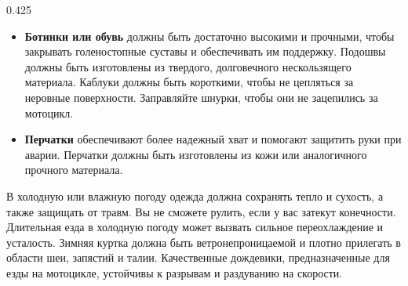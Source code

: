 \begin{langblock}{0.425}
\begin{rus}
\begin{itemize}[nosep]
			\item \textbf{Ботинки или обувь} должны быть достаточно высокими и прочными, чтобы закрывать голеностопные суставы и обеспечивать им поддержку. Подошвы должны быть изготовлены из твердого, долговечного нескользящего материала. Каблуки должны быть короткими, чтобы не цепляться за неровные поверхности. Заправляйте шнурки, чтобы они не зацепились за мотоцикл.
			\item \textbf{Перчатки} обеспечивают более надежный хват и помогают защитить руки при аварии. Перчатки должны быть изготовлены из кожи или аналогичного прочного материала.
		\end{itemize}
		В холодную или влажную погоду одежда должна сохранять тепло и сухость, а также защищать от травм. Вы не сможете рулить, если у вас затекут конечности. Длительная езда в холодную погоду может вызвать сильное переохлаждение и усталость. Зимняя куртка должна быть ветронепроницаемой и плотно прилегать в области шеи, запястий и талии. Качественные дождевики, предназначенные для езды на мотоцикле, устойчивы к разрывам и раздуванию на скорости.
\end{rus}
\end{langblock}



